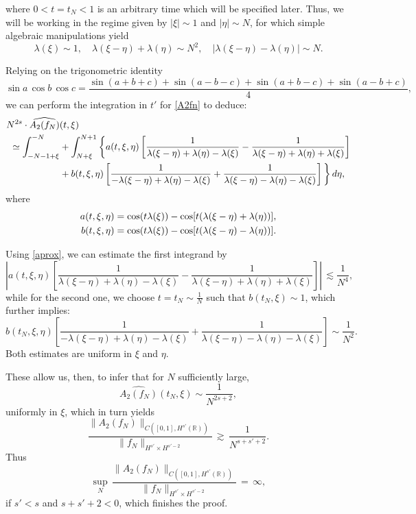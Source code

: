 \documentclass{amsart}
\begin{document}
where $0<t=t_N<1$ is an arbitrary time which will be specified later. Thus, we will be working in the regime given by $ |\xi|\sim 1$ and $|\eta|\sim N$, for which simple algebraic manipulations yield
\begin{equation}
\lambda(\xi) \sim 1,\quad \lambda(\xi-\eta)+\lambda(\eta) \sim N^2, \quad \left| \lambda(\xi-\eta)-\lambda(\eta)\right| \sim N.
\label{aprox}
\end{equation}

Relying on the trigonometric identity
\[
\sin a\,\cos b\,\cos c=\frac{\sin (a+b+c)+\sin (a-b-c)+\sin (a+b-c)+\sin (a-b+c)}{4},
\]
we can perform the integration in $t'$ for \eqref{A2fn} to deduce:
\begin{equation}
\aligned
N^{2s}\cdot \widehat{A_2(f_N)}&(t,\xi)\\ 
\simeq  \int_{- N-1+\xi}^{-N} &+\int_{N+\xi}^{N+1} \bigg\{ a(t,\xi,\eta) \left[ \frac{1}{\lambda(\xi - \eta) + \lambda(\eta)- \lambda(\xi)} - \frac{1}{\lambda(\xi - \eta) + \lambda(\eta)+\lambda(\xi)} \right]\\
&+b(t,\xi,\eta) \left[ \frac{1}{-\lambda(\xi - \eta) + \lambda(\eta)-\lambda(\xi)} + \frac{1}{\lambda(\xi - \eta) - \lambda(\eta)-\lambda(\xi)} \right]\bigg\}\,d\eta,
\endaligned
\end{equation}
where
\begin{equation}\aligned
a(t,\xi,\eta)&= \cos (t\lambda(\xi))-\cos[t(\lambda(\xi - \eta) + \lambda(\eta))],\\ b(t,\xi,\eta)&= \cos (t\lambda(\xi))-\cos[t(\lambda(\xi - \eta) - \lambda(\eta))].
\endaligned
\end{equation}

Using \eqref{aprox}, we can estimate the first integrand by
\[
\left|a(t,\xi,\eta) \left[ \frac{1}{\lambda(\xi - \eta) + \lambda(\eta)- \lambda(\xi)} - \frac{1}{\lambda(\xi - \eta) + \lambda(\eta)+\lambda(\xi)} \right]\right|\,\lesssim \frac{1}{N^4}, 
\]
while for the second one, we choose $t=t_N \sim \frac{1}{N}$ such that $b(t_N,\xi) \sim 1$, which further implies:
\[
b(t_N,\xi,\eta) \left[ \frac{1}{-\lambda(\xi - \eta) + \lambda(\eta)-\lambda(\xi)} + \frac{1}{\lambda(\xi - \eta) - \lambda(\eta)-\lambda(\xi)} \right] \sim \frac{1}{N^2}.\]
Both estimates are uniform in $\xi$ and $\eta$.

These allow us, then, to infer that for $N$ sufficiently large,
\[
\widehat{A_2(f_N)}(t_N,\xi) \sim \frac{1}{N^{2s+2}},
\]
uniformly in $\xi$, which in turn yields
\[
\frac{\|A_2(f_N)\|_{C([0,1], H^{s'}(\mathbb{R}))}}{\|f_N\|_{H^{s'}\times H^{s'-2}}}\,\gtrsim\, \frac{1}{N^{s+s'+2}}.\]
Thus
\[
\sup_N\,\frac{\|A_2(f_N)\|_{C([0,1], H^{s'}(\mathbb{R}))}}{\|f_N\|_{H^{s'}\times H^{s'-2}}}\,=\,\infty,\]
if $s'<s$ and $s+s'+2<0$, which finishes the proof.
\end{document}
